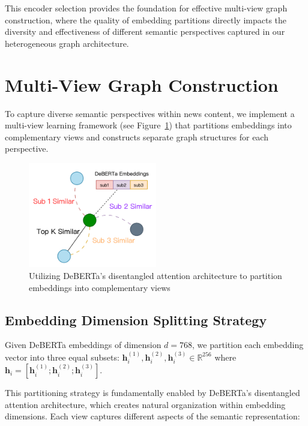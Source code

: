 This encoder selection provides the foundation for effective multi-view graph construction, where the quality of embedding partitions directly impacts the diversity and effectiveness of different semantic perspectives captured in our heterogeneous graph architecture.

\section{Multi-View Graph Construction}

To capture diverse semantic perspectives within news content, we implement a multi-view learning framework (see Figure~\ref{fig:multi_view}) that partitions embeddings into complementary views and constructs separate graph structures for each perspective.

\begin{figure}[h]
    \centering
    \includegraphics[width=0.5\textwidth]{context/methodology/fig/multi_view.png}
    \caption{Utilizing DeBERTa's disentangled attention architecture to partition embeddings into complementary views}
    \label{fig:multi_view}
\end{figure}

\subsection{Embedding Dimension Splitting Strategy}

Given DeBERTa embeddings of dimension $d = 768$, we partition each embedding vector into three equal subsets: $\mathbf{h}_i^{(1)}, \mathbf{h}_i^{(2)}, \mathbf{h}_i^{(3)} \in \mathbb{R}^{256}$ where $\mathbf{h}_i = [\mathbf{h}_i^{(1)}; \mathbf{h}_i^{(2)}; \mathbf{h}_i^{(3)}]$.

This partitioning strategy is fundamentally enabled by DeBERTa's disentangled attention architecture, which creates natural organization within embedding dimensions. Each view captures different aspects of the semantic representation:

